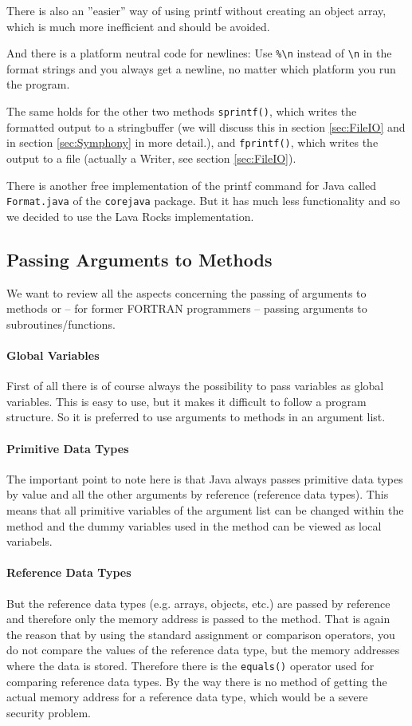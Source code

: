 There is also an ''easier'' way of using printf without creating
an object array, which is much more inefficient and should be avoided.

And there is a platform neutral code for newlines: Use \verb|%\n| instead
of \verb|\n| in the format strings and you always get a newline,
no matter which platform you run the program.

The same holds for the other two methods \verb|sprintf()|, which writes
the formatted output to a stringbuffer (we will discuss this in section
\ref{sec:FileIO} and in section \ref{sec:Symphony} in more detail.),
and \verb|fprintf()|, which writes the output to a file (actually a
Writer, see section \ref{sec:FileIO}).

There is another free implementation of the printf command for
Java called \verb|Format.java| of the \verb|corejava| package.
But it has much less functionality and so we decided to use
the Lava Rocks implementation.

\subsection{Passing Arguments to Methods}
\label{sec:PassingArguments}
We want to review all the aspects concerning the passing of
arguments to methods or -- for former FORTRAN programmers --
passing arguments to subroutines/functions.

\paragraph{Global Variables}
First of all there is of course always the possibility to 
pass variables as global variables. This is easy to use,
but it makes it difficult to follow a program structure.
So it is preferred to use arguments to methods in an
argument list.

\paragraph{Primitive Data Types}
The important point to note here is that Java always
passes primitive data types by value and all the other
arguments by reference (reference data types). 
This means that all primitive
variables of the argument list can be changed within
the method and the dummy variables used in the method 
can be viewed as local variabels.

\paragraph{Reference Data Types}
But the reference data types (e.g. arrays, objects, etc.)
are passed by reference and therefore only the memory
address is passed to the method. That is again the reason that
by using the standard assignment or comparison operators,
you do not compare the values of the reference data type, but
the memory addresses where the data is stored. Therefore there
is the \verb|equals()| operator used for comparing reference data
types. By the way there is no method
of getting the actual memory address for a reference data type,
which would be a severe security problem.

